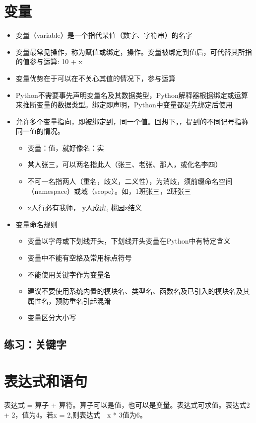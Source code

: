\section{变量}
\begin{itemize}
\item 变量（variable）是一个指代某值（数字、字符串）的名字
\item 变量最常见操作，称为赋值或绑定，操作。变量被绑定到值后，可代替其所指的值参与运算: 10 + x
\item 变量优势在于可以在不关心其值的情况下，参与运算
\item Python不需要事先声明变量名及其数据类型，Python解释器根据绑定或运算来推断变量的数据类型。绑定即声明，Python中变量都是先绑定后使用
\item 允许多个变量指向，即被绑定到，同一个值。回想下，，提到的不同记号指称同一值的情况。
  \begin{itemize}
  \item 变量：值，就好像名：实
  \item 某人张三，可以两名指此人（张三、老张、那人，或化名李四）
  \item 不可一名指两人（重名，歧义，二义性），为消歧，须前缀命名空间（namespace）或域（scope）。如，1班张三，2班张三
  \item x人行必有我师， y人成虎, 桃园z结义
  \end{itemize}
\item 变量命名规则
  \begin{itemize}
  \item 变量以字母或下划线开头，下划线开头变量在Python中有特定含义
  \item 变量中不能有空格及常用标点符号
  \item 不能使用关键字作为变量名
  \item 建议不要使用系统内置的模块名、类型名、函数名及已引入的模块名及其属性名，预防重名引起混淆
  \item 变量区分大小写
  \end{itemize}
\end{itemize}
\subsection{练习：关键字}

\section{表达式和语句}
表达式 = 算子 + 算符。算子可以是值，也可以是变量。表达式可求值。表达式2 + 2，值为4。若x = 2,则表达式　x * 3值为6。

